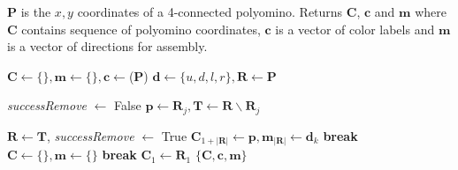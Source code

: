 \begin{algorithm}
\newcommand\algotext[1]{\end{algorithmic}#1\begin{algorithmic}[1]}
\caption{($\mathbf{P})$   \label{alg:FindBuildPath}}
$\mathbf{P}$ is the $x,y$ coordinates of a 4-connected polyomino. 
Returns $ \mathbf{C} $, $ \mathbf{c} $ and $\mathbf{m}$ where $ \mathbf{C} $ contains sequence of polyomino coordinates, $ \mathbf{c} $ is a vector of color labels and $\mathbf{m}$ is a vector of directions for assembly.
\begin{algorithmic}[1]

\State\hbox{$\mathbf{C} \leftarrow \{\}, \mathbf{m} \leftarrow \{\}, \mathbf{c}\leftarrow${}($\mathbf{P}$)}
\State $\mathbf{d} \gets\{u,d,l,r\}, \mathbf{R} \gets \mathbf{P}$

\State  \emph{successRemove} $\gets$ {\sc False}
\State $\mathbf{p} \gets \mathbf{R}_j,  \mathbf{T} \gets  \mathbf{R}  \backslash   \mathbf{R}_j$

 \label{alg:line:checkpathtile}

\State  $\mathbf{R} \gets \mathbf{T}$,   \emph{successRemove} $\gets$ {\sc True}
\State  $\mathbf{C}_{ 1+|\mathbf{R}|} \gets \mathbf{p},  \mathbf{m}_{ |\mathbf{R}|}  \gets \mathbf{d}_k$
\State \textbf{break}
\EndIf
\EndIf
\EndFor
\EndFor
{}
\State  \hbox{$\mathbf{C} \leftarrow \{\}, \mathbf{m} \leftarrow \{\}$}
\State \textbf{break}
\EndIf
\EndFor
{}
\State  $\mathbf{C}_{ 1} \gets \mathbf{R}_1 $
\EndIf
\State \Return $\{ \mathbf{C},\mathbf{c}, \mathbf{m} \}$ 
\end{algorithmic}
\end{algorithm} 

